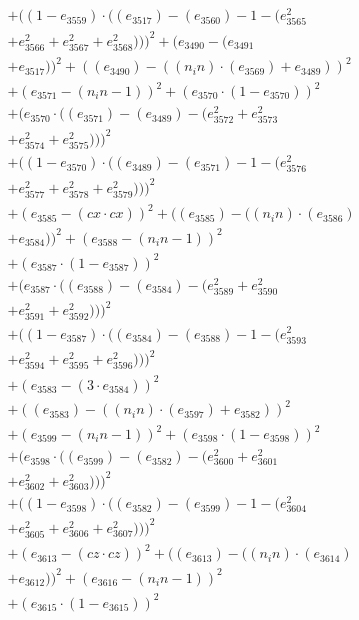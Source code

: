 \documentclass[10pt, a4paper]{article}
\begin{document}
\begin{align*}
& + ((1 - e_{3559})  \cdot  ((e_{3517}) - (e_{3560}) - 1 - (e_{3565}^{2} \\
& + e_{3566}^{2} + e_{3567}^{2} + e_{3568}^{2})))^{2} + (e_{3490} - (e_{3491} \\
& + e_{3517}))^{2} + ((e_{3490}) - ((n_in)  \cdot  (e_{3569}) + e_{3489}))^{2} \\
& + (e_{3571} - (n_in - 1))^{2} + (e_{3570}  \cdot  (1 - e_{3570}))^{2} \\
& + (e_{3570}  \cdot  ((e_{3571}) - (e_{3489}) - (e_{3572}^{2} + e_{3573}^{2} \\
& + e_{3574}^{2} + e_{3575}^{2})))^{2} \\
& + ((1 - e_{3570})  \cdot  ((e_{3489}) - (e_{3571}) - 1 - (e_{3576}^{2} \\
& + e_{3577}^{2} + e_{3578}^{2} + e_{3579}^{2})))^{2} \\
& + (e_{3585} - (cx  \cdot  cx))^{2} + ((e_{3585}) - ((n_in)  \cdot  (e_{3586}) \\
& + e_{3584}))^{2} + (e_{3588} - (n_in - 1))^{2} \\
& + (e_{3587}  \cdot  (1 - e_{3587}))^{2} \\
& + (e_{3587}  \cdot  ((e_{3588}) - (e_{3584}) - (e_{3589}^{2} + e_{3590}^{2} \\
& + e_{3591}^{2} + e_{3592}^{2})))^{2} \\
& + ((1 - e_{3587})  \cdot  ((e_{3584}) - (e_{3588}) - 1 - (e_{3593}^{2} \\
& + e_{3594}^{2} + e_{3595}^{2} + e_{3596}^{2})))^{2} \\
& + (e_{3583} - (3  \cdot  e_{3584}))^{2} \\
& + ((e_{3583}) - ((n_in)  \cdot  (e_{3597}) + e_{3582}))^{2} \\
& + (e_{3599} - (n_in - 1))^{2} + (e_{3598}  \cdot  (1 - e_{3598}))^{2} \\
& + (e_{3598}  \cdot  ((e_{3599}) - (e_{3582}) - (e_{3600}^{2} + e_{3601}^{2} \\
& + e_{3602}^{2} + e_{3603}^{2})))^{2} \\
& + ((1 - e_{3598})  \cdot  ((e_{3582}) - (e_{3599}) - 1 - (e_{3604}^{2} \\
& + e_{3605}^{2} + e_{3606}^{2} + e_{3607}^{2})))^{2} \\
& + (e_{3613} - (cz  \cdot  cz))^{2} + ((e_{3613}) - ((n_in)  \cdot  (e_{3614}) \\
& + e_{3612}))^{2} + (e_{3616} - (n_in - 1))^{2} \\
& + (e_{3615}  \cdot  (1 - e_{3615}))^{2} \\

\end{align*}
\end{document}
